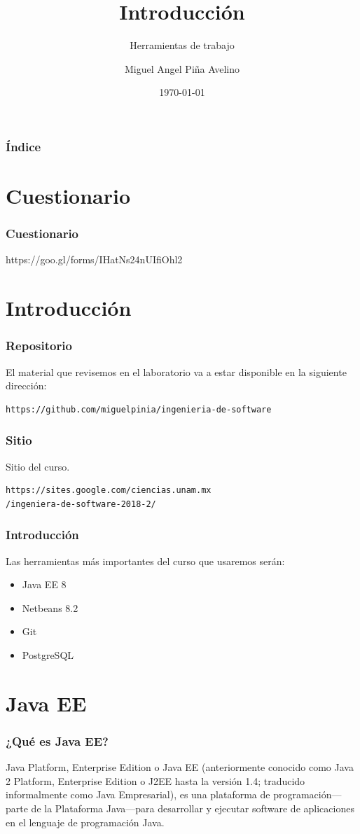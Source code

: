 \documentclass{beamer}
\title[Laboratorio]{Introducción}
\subtitle{Herramientas de trabajo}
\author[Miguel]{Miguel Angel Piña Avelino}
\institute[UNAM]{
  Facultad de Ciencias, UNAM
}
\date{\today}
\begin{document}
\frame{\titlepage}

\begin{frame}
  \frametitle{Índice}
  \tableofcontents
\end{frame}

\section{Cuestionario}

\begin{frame}
  \frametitle{Cuestionario}
  https://goo.gl/forms/IHatNs24nUIfiOhl2
\end{frame}

\section{Introducción}

\begin{frame}[fragile]
  \frametitle{Repositorio}
  El material que revisemos en el laboratorio va a estar disponible en
  la siguiente dirección:
\begin{verbatim}
https://github.com/miguelpinia/ingenieria-de-software
\end{verbatim}
\end{frame}

\begin{frame}[fragile]
  \frametitle{Sitio}
  Sitio del curso.
\begin{verbatim}
https://sites.google.com/ciencias.unam.mx
/ingeniera-de-software-2018-2/
\end{verbatim}
\end{frame}

\begin{frame}
  \frametitle{Introducción}
  Las herramientas más importantes del curso que usaremos serán:
  \begin{itemize}
    \item Java EE 8
    \item Netbeans 8.2
    \item Git
    \item PostgreSQL
  \end{itemize}
\end{frame}

\section{Java EE}

\begin{frame}
  \frametitle{¿Qué es Java EE?}
  Java Platform, Enterprise Edition o Java EE (anteriormente conocido
  como Java 2 Platform, Enterprise Edition o J2EE hasta la versión
  1.4; traducido informalmente como Java Empresarial), es una
  plataforma de programación—parte de la Plataforma Java—para
  desarrollar y ejecutar software de aplicaciones en el lenguaje de
  programación Java.
\end{frame}
\end{document}
